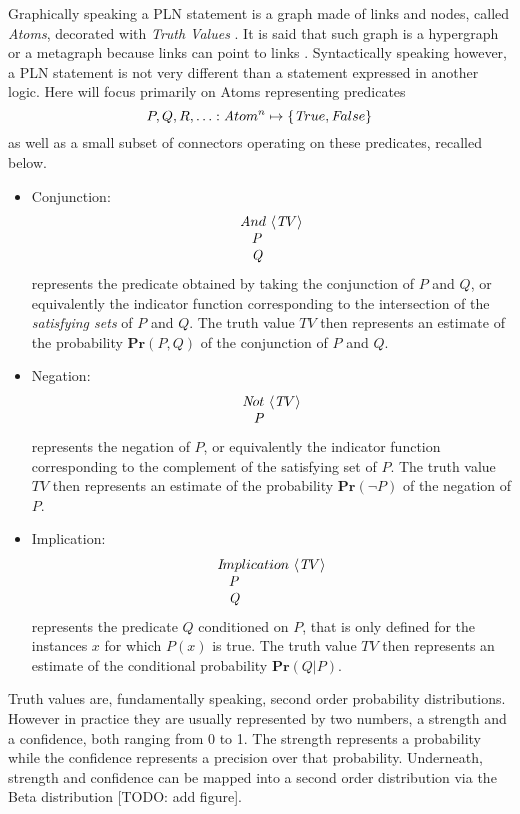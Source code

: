 \documentclass[runningheads]{llncs}
\newcommand{\SP}{\;\;\;}
\newcommand{\TP}{\textit P}
\newcommand{\TQ}{\textit Q}
\newcommand{\TTrue}{\textit True}
\newcommand{\TFalse}{\textit False}
\newcommand{\TAtom}{\textit Atom}
\newcommand{\TImpl}{{\textit Implication}}
\newcommand{\TAnd}{{\textit And}}
\newcommand{\TNot}{{\textit Not}}
\newcommand{\TTV}{\langle \textit TV \rangle}
\begin{document}
Graphically speaking a PLN statement is a graph made of links and
nodes, called \emph{Atoms}, decorated with \emph{Truth Values}
\cite{TODO}.  It is said that such graph is a hypergraph or a
metagraph because links can point to links \cite{TODO}.  Syntactically
speaking however, a PLN statement is not very different than a
statement expressed in another logic.  Here will focus primarily on
Atoms representing predicates
$$P, Q, R, \hdots: \TAtom^n \mapsto \{\TTrue, \TFalse\}$$ as well as a
small subset of connectors operating on these predicates, recalled
below.
\begin{itemize}
\item Conjunction:
  $$
  \begin{array}{l}
    \TAnd\ \TTV\\
    \SP \TP\\
    \SP \TQ\\
  \end{array}
  $$
  represents the predicate obtained by taking the conjunction of
  $P$ and $Q$, or equivalently the indicator function corresponding to
  the intersection of the \emph{satisfying sets} of $P$ and $Q$.  The
  truth value $\textit{TV}$ then represents an estimate of the
  probability $\mathbf{Pr}(P,Q)$ of the conjunction of $P$ and $Q$.
\item Negation:
  $$
  \begin{array}{l}
    \TNot\ \TTV\\
    \SP \TP\\
  \end{array}
  $$
  represents the negation of $P$, or equivalently the indicator
  function corresponding to the complement of the satisfying set of
  $P$. The truth value $\textit{TV}$ then represents an estimate of
  the probability $\mathbf{Pr}(\neg P)$ of the negation of $P$.
\item Implication:
  $$
  \begin{array}{l}
    \TImpl\ \TTV\\
    \SP \TP\\
    \SP \TQ\\
  \end{array}
  $$ represents the predicate $Q$ conditioned on $P$, that is only
  defined for the instances $x$ for which $P(x)$ is true.  The truth
  value $\textit{TV}$ then represents an estimate of the conditional
  probability $\mathbf{Pr}(Q|P)$.
\end{itemize}
Truth values are, fundamentally speaking, second order probability
distributions. However in practice they are usually represented by two
numbers, a strength and a confidence, both ranging from 0 to 1.  The
strength represents a probability while the confidence represents a
precision over that probability.  Underneath, strength and confidence
can be mapped into a second order distribution via the Beta
distribution [TODO: add figure].
\end{document}
